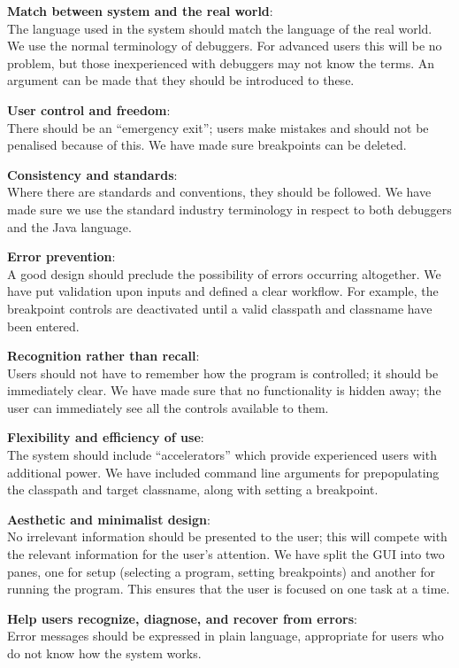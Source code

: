 \documentclass[11pt, a4paper]{report}
\begin{document}
{\bfseries Match between system and the real world}: \\
The language used in the system should match the language of the real world. We use the normal terminology of debuggers. For advanced users this will be no problem, but those inexperienced with debuggers may not know the terms. An argument can be made that they should be introduced to these.

{\bfseries User control and freedom}: \\
There should be an “emergency exit”; users make mistakes and should not be penalised because of this. We have made sure breakpoints can be deleted.

{\bfseries Consistency and standards}: \\
Where there are standards and conventions, they should be followed. We have made sure we use the standard industry terminology in respect to both debuggers and the Java language.

{\bfseries Error prevention}: \\
A good design should preclude the possibility of errors occurring altogether. We have put validation upon inputs and defined a clear workflow. For example, the breakpoint controls are deactivated until a valid classpath and classname have been entered.

{\bfseries Recognition rather than recall}: \\
Users should not have to remember how the program is controlled; it should be immediately clear. We have made sure that no functionality is hidden away; the user can immediately see all the controls available to them.

{\bfseries Flexibility and efficiency of use}: \\
The system should include “accelerators” which provide experienced users with additional power. We have included command line arguments for prepopulating the classpath and target classname, along with setting a breakpoint.

{\bfseries Aesthetic and minimalist design}: \\
No irrelevant information should be presented to the user; this will compete with the relevant information for the user’s attention. We have split the GUI into two panes, one for setup (selecting a program, setting breakpoints) and another for running the program. This ensures that the user is focused on one task at a time.

{\bfseries Help users recognize, diagnose, and recover from errors}: \\
Error messages should be expressed in plain language, appropriate for users who do not know how the system works.
\end{document}
